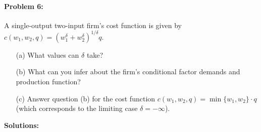 \documentclass[12pt]{article}
\begin{document}
\paragraph{Problem 6:} A single-output two-input firm's cost function is given by $c(w_1,w_2,q) = (w^\delta_1 + w^\delta_2)^{1/\delta} q$.

\begin{itemize}
    \item[(a)] What values can $\delta$ take?

    \item[(b)] What can you infer about the firm's conditional factor demands and production function?

    \item[(c)] Answer question (b) for the cost function $c(w_1,w_2,q) = \min\{w_1,w_2\}\cdot q$ (which corresponds to the limiting case $\delta = -\infty$).
\end{itemize}

\medskip

\textbf{Solutions:}
\end{document}
